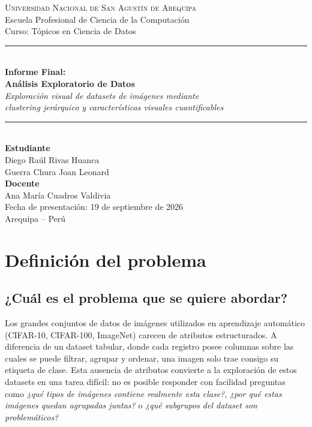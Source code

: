 \documentclass[11pt,a4paper]{article}
\begin{document}
\begin{titlepage}
\centering
\vspace*{1.5cm}

{\large\scshape Universidad Nacional de San Agustín de Arequipa}\\[0.3cm]
{\large Escuela Profesional de Ciencia de la Computación}\\[0.2cm]
{\large Curso: Tópicos en Ciencia de Datos}\\[1.5cm]

\rule{\textwidth}{1.2pt}\\[0.5cm]
{\Huge\bfseries Informe Final:\\[0.3cm] Análisis Exploratorio de Datos}\\[0.5cm]
{\Large\itshape Exploración visual de datasets de imágenes mediante\\ clustering jerárquico y características visuales cuantificables}\\[0.4cm]
\rule{\textwidth}{1.2pt}\\[2cm]

{\large\textbf{Estudiante}}\\[0.3cm]
{\large Diego Raúl Rivas Huanca}\\
{\large Guerra Chura Joan Leonard}\\[2cm]

{\large\textbf{Docente}}\\[0.3cm]
{\large Ana María Cuadros Valdivia}\\[2cm]

{\large Fecha de presentación: 19 de septiembre de 2026}\\[1cm]
{\large Arequipa -- Perú}

\vfill
\end{titlepage}

\tableofcontents
\newpage

\section{Definición del problema}

\subsection*{¿Cuál es el problema que se quiere abordar?}

Los grandes conjuntos de datos de imágenes utilizados en aprendizaje automático
(CIFAR-10, CIFAR-100, ImageNet) carecen de atributos estructurados. A diferencia
de un dataset tabular, donde cada registro posee columnas sobre las cuales se
puede filtrar, agrupar y ordenar, una imagen solo trae consigo su etiqueta de
clase. Esta ausencia de atributos convierte a la exploración de estos datasets en
una tarea difícil: no es posible responder con facilidad preguntas como
\emph{¿qué tipos de imágenes contiene realmente esta clase?},
\emph{¿por qué estas imágenes quedan agrupadas juntas?} o
\emph{¿qué subgrupos del dataset son problemáticos?}
\end{document}
